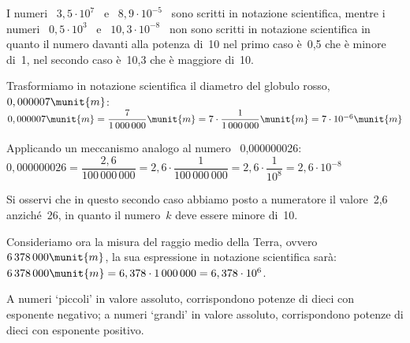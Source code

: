 \begin{esempio}{}{}
I numeri~ \(3,5\cdot10^7\)~ e ~\(8,9\cdot10^{-5}\)~ sono scritti in 
notazione scientifica, mentre i numeri~ \(0,5\cdot10^3\)~ 
e ~\(10,3\cdot 10^{-8}\)~ non sono scritti in notazione scientifica in 
quanto il numero davanti alla potenza di~10 nel primo caso è~0,5 che è 
minore di~1, nel secondo caso è~10,3 che è maggiore di~10.
\end{esempio}

Trasformiamo in notazione scientifica il diametro del globulo rosso, 
~\(0,000007\munit{m}\): \\
\(0,000007\munit{m}=\dfrac{7}{1\,000\,000}\munit{m}=
  7\cdot\dfrac{1}{1\,000\,000}\munit{m}=
  7\cdot10^{-6}\munit{m}\)

\vspace{.5em}
Applicando un meccanismo analogo al numero ~0,000000026: \\ 
\(0,000000026=\dfrac{2,6}{100\,000\,000}=
  2,6\cdot\dfrac{1}{100\,000\,000}=
  2,6\cdot\dfrac{1}{10^8}=2,6\cdot10^{-8}\)

Si osservi che in questo secondo caso abbiamo posto a numeratore il 
valore~2,6 anziché~26, in quanto il numero~\(k\) deve essere minore di~10.

Consideriamo ora la misura del raggio medio della Terra, 
ovvero~\(6\,378\,000\munit{m}\),
la sua espressione in notazione scientifica sarà: \\ 
\(6\,378\,000\munit{m} = 6,378\cdot1\,000\,000 = 6,378\cdot10^6\).


{\notesp}


\begin{osservazione}{}{}
A numeri `piccoli' in valore assoluto, corrispondono potenze di dieci con 
esponente negativo; 
a numeri `grandi' in valore assoluto, corrispondono potenze di dieci con 
esponente positivo.
\end{osservazione}


